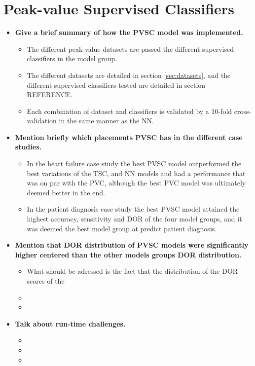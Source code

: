 \section{Peak-value Supervised Classifiers}

\begin{itemize}
    \item \textbf{Give a brief summary of how the PVSC model was implemented.}
    \begin{itemize}
        \item The different peak-value datasets are passed the different supervised classifiers in the model group. 
        \item The different datasets are detailed in section \ref{sec:datasets}, and the different supervised classifiers tested are detailed in section REFERENCE.
        \item Each combination of dataset and classifiers is validated by a 10-fold cross-validation in the same manner as the NN. 
    \end{itemize}
    \item \textbf{Mention briefly which placements PVSC has in the different case studies.}
    \begin{itemize}
        \item In the heart failure case study the best PVSC model outperformed the best variations of the TSC, and NN models and had a performance that was on par with the PVC, although the best PVC model was ultimately deemed better in the end.
        \item In the patient diagnosis case study the best PVSC model attained the highest accuracy, sensitivity and DOR of the four model groups, and it was deemed the best model group at predict patient diagnosis. 
    \end{itemize}
    \item \textbf{Mention that DOR distribution of PVSC models were significantly higher centered than the other models groups DOR distribution.}
    \begin{itemize}
        \item What should be adressed is the fact that the distribution of the DOR scores of the 
        \item 
        \item 
    \end{itemize}
    \item \textbf{Talk about run-time challenges.}
    \begin{itemize}
        \item 
        \item 
        \item 
    \end{itemize}
\end{itemize}
